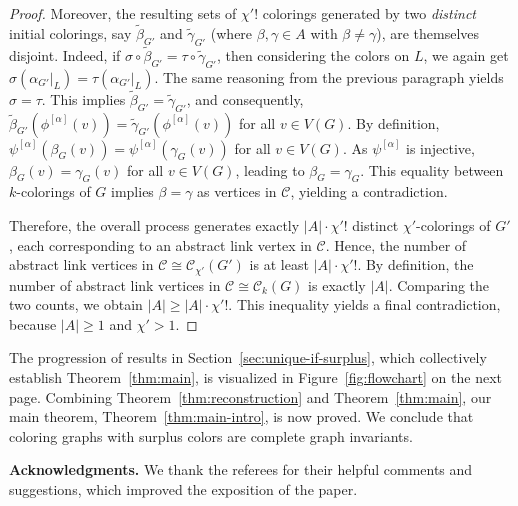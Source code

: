 \documentclass{amsart}
\theoremstyle{hypothesisstyle}
\theoremstyle{definition}
\theoremstyle{remark}
\numberwithin{equation}{section}
\begin{document}
\begin{proof}
    Moreover, the resulting sets of $\chi'!$ colorings generated by two \emph{distinct} initial colorings, say $\widetilde{\beta}_{G'}$ and $\widetilde{\gamma}_{G'}$ (where $\beta, \gamma\in A$ with $\beta\neq \gamma$), are themselves disjoint. Indeed, if $\sigma\circ \widetilde{\beta}_{G'}=\tau\circ \widetilde{\gamma}_{G'}$, then considering the colors on $L$, we again get $\sigma(\alpha_{G'}|_{L})=\tau(\alpha_{G'}|_{L})$. The same reasoning from the previous paragraph yields $\sigma=\tau$. This implies $\widetilde{\beta}_{G'}=\widetilde{\gamma}_{G'}$, and consequently, $\widetilde{\beta}_{G'}(\phi^{[\alpha]}(v))=\widetilde{\gamma}_{G'}(\phi^{[\alpha]}(v))$ for all $v\in V(G)$. By definition, $\psi^{[\alpha]}(\beta_{G}(v)) = \psi^{[\alpha]}(\gamma_{G}(v))$ for all $v\in V(G)$.  As $\psi^{[\alpha]}$ is injective, $\beta_G(v)=\gamma_G(v)$ for all $v\in V(G)$, leading to $\beta_{G}=\gamma_{G}$. This equality between $k$-colorings of $G$ implies $\beta=\gamma$ as vertices in $\mathcal{C}$, yielding a contradiction.

    Therefore, the overall process generates exactly $|A|\cdot \chi'!$ distinct $\chi'$-colorings of $G'$, each corresponding to an abstract link vertex in $\mathcal{C}$. Hence, the number of abstract link vertices in $\mathcal{C}\cong \mathcal{C}_{\chi'}(G')$ is at least $|A|\cdot \chi'!$. By definition, the number of abstract link vertices in $\mathcal{C}\cong \mathcal{C}_{k}(G)$ is exactly $|A|$. Comparing the two counts, we obtain $|A|\geq |A|\cdot \chi'!$. This inequality yields a final contradiction, because $|A|\geq 1$ and $\chi'>1$.
\end{proof}

The progression of results in Section~\ref{sec:unique-if-surplus}, which collectively establish Theorem~\ref{thm:main}, is visualized in Figure~\ref{fig:flowchart} on the next page. Combining Theorem~\ref{thm:reconstruction} and Theorem~\ref{thm:main}, our main theorem, Theorem~\ref{thm:main-intro}, is now proved. We conclude that coloring graphs with surplus colors are complete graph invariants. 

\medskip 

\textbf{Acknowledgments.} We thank the referees for their helpful comments and suggestions, which improved the exposition of the paper.

\newpage 
\end{document}
